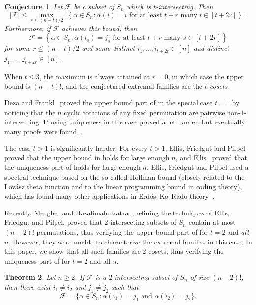 \documentclass{article}
\newtheorem{theorem}{Theorem}[section]
\newtheorem{conjecture}[theorem]{Conjecture}
\theoremstyle{definition}
\begin{document}
\begin{conjecture} \label{cnj:AK-sym}
Let $\mathcal{F}$ be a subset of $S_n$ which is $t$-intersecting. Then
\[
 |\mathcal{F}| \leq \max_{r \leq (n-t)/2} \left|\left\{ \alpha \in S_n : \alpha(i) = i \text{ for at least } t+r \text{ many } i \in [t+2r] \right\}\right|.
\]
Furthermore, if $\mathcal{F}$ achieves this bound, then
\[
 \mathcal{F} = \left\{ \alpha \in S_n : \alpha(i_s) = j_s \text{ for at least } t+r \text{ many } s \in [t+2r] \right\}
\]
for some $r \leq (n-t)/2$ and some distinct $i_1,\ldots,i_{t+2r} \in [n]$ and distinct $j_1,\ldots,j_{t+2r} \in [n]$.
\end{conjecture}

When $t \leq 3$, the maximum is always attained at $r = 0$, in which case the upper bound is $(n-t)!$, and the conjectured extremal families are the \emph{$t$-cosets}.

Deza and Frankl~\cite{DezaFrankl} proved the upper bound part of  in the special case $t = 1$ by noticing that the $n$ cyclic rotations of any fixed permutation are pairwise non-$1$-intersecting. Proving uniqueness in this case proved a lot harder, but eventually many proofs were found~\cite{CameronKu,LaroseMalvenuto,GodsilMeagher,EFP}.

The case $t > 1$ is significantly harder. For every $t > 1$, Ellis, Friedgut and Pilpel~\cite{EFP} proved that the upper bound in  holds for large enough $n$, and Ellis~\cite{EllisCameronKu} proved that the uniqueness part of  holds for large enough $n$. Ellis, Friedgut and Pilpel used a spectral technique based on the so-called Hoffman bound (closely related to the Lov\'asz theta function and to the linear programming bound in coding theory), which has found many other applications in Erd\H{o}s--Ko--Rado theory~\cite{GodsilMeagherBook}.

Recently, Meagher and Razafimahatratra~\cite{MR21}, refining the techniques of Ellis, Friedgut and Pilpel, proved that $2$-intersecting subsets of $S_n$ contain at most $(n-2)!$ permutations, thus verifying the upper bound part of  for $t = 2$ and \emph{all} $n$. However, they were unable to characterize the extremal families in this case. In this paper, we show that all such families are $2$-cosets, thus verifying the uniqueness part of  for $t = 2$ and all $n$.

\begin{theorem} \label{thm:main-sym}
Let $n \geq 2$. If $\mathcal{F}$ is a $2$-intersecting subset of $S_n$ of size $(n-2)!$, then there exist $i_1 \neq i_2$ and $j_1 \neq j_2$ such that
\[
 \mathcal{F} = \{ \alpha \in S_n : \alpha(i_1) = j_1 \text{ and } \alpha(i_2) = j_2 \}.
\]
\end{theorem}
\end{document}
